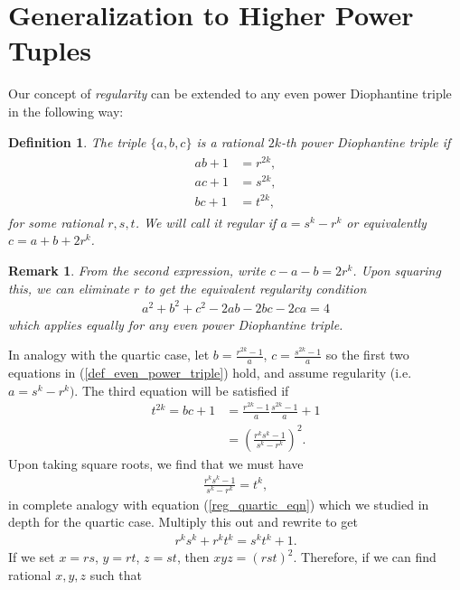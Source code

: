 \documentclass{amsart}
\newtheorem{definition}{Definition}
\newtheorem{remark}{Remark}
\begin{document}
\section{Generalization to Higher Power Tuples}
Our concept of \emph{regularity} can be extended to any even power Diophantine triple in the following way:
\begin{definition}
    The triple $\{a,b,c\}$ is a rational $2k$-th power Diophantine triple if
\begin{align} \label{def_even_power_triple}
\begin{split}
    ab+1&=r^{2k}, \\
    ac+1&=s^{2k}, \\
    bc+1&=t^{2k},
\end{split}
\end{align}
for some rational $r,s,t$. We will call it regular if $a=s^k-r^k$ or equivalently $c=a+b+2r^k$.
\end{definition}
\begin{remark}
    From the second expression, write $c-a-b=2r^k$. Upon squaring this, we can eliminate $r$ to get the equivalent regularity condition 
    \begin{align} \label{regularity_condition}
        a^2+b^2+c^2-2ab-2bc-2ca=4
    \end{align} which applies equally for any even power Diophantine triple.
\end{remark}
In analogy with the quartic case, let $b=\frac{r^{2k}-1}{a}$, $c=\frac{s^{2k}-1}{a}$ so the first two equations in (\ref{def_even_power_triple}) hold, and assume regularity (i.e. $a=s^k-r^k)$. The third equation will be satisfied if
\begin{align*}
    t^{2k} = bc+1 &= \frac{r^{2k}-1}{a}\frac{s^{2k}-1}{a}+1\\
    &=\left(\frac{r^ks^k-1}{s^k-r^k}\right)^2.
\end{align*}Upon taking square roots, we find that we must have
\begin{align*}
    \frac{r^ks^k-1}{s^k-r^k}=t^k,
\end{align*}
in complete analogy with equation (\ref{reg_quartic_eqn}) which we studied in depth for the quartic case. Multiply this out and rewrite to get 
\begin{align*}
    r^ks^k+r^kt^k=s^kt^k+1.
\end{align*}
If we set $x=rs$, $y=rt$, $z=st$, then $xyz=(rst)^2$. Therefore, if we can find rational $x,y,z$ such that
\end{document}
